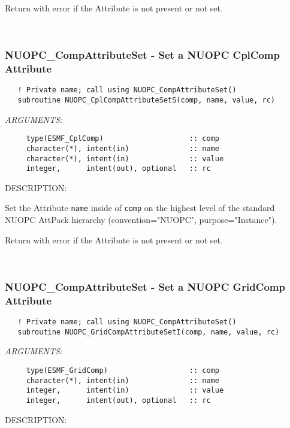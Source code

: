      Return with error if the Attribute is not present or not set. 
 
\mbox{}\hrulefill\ 
 
\subsubsection [NUOPC\_CompAttributeSet] {NUOPC\_CompAttributeSet - Set a NUOPC CplComp Attribute}


\begin{verbatim}   ! Private name; call using NUOPC_CompAttributeSet() 
   subroutine NUOPC_CplCompAttributeSetS(comp, name, value, rc)\end{verbatim}{\em ARGUMENTS:}
\begin{verbatim}     type(ESMF_CplComp)                    :: comp
     character(*), intent(in)              :: name
     character(*), intent(in)              :: value
     integer,      intent(out), optional   :: rc\end{verbatim}
{\sf DESCRIPTION:\\ }


     Set the Attribute {\tt name} inside of {\tt comp} on the highest level
     of the standard NUOPC AttPack hierarchy (convention="NUOPC", 
     purpose="Instance").
  
     Return with error if the Attribute is not present or not set. 
 
\mbox{}\hrulefill\ 
 
\subsubsection [NUOPC\_CompAttributeSet] {NUOPC\_CompAttributeSet - Set a NUOPC GridComp Attribute}


\begin{verbatim}   ! Private name; call using NUOPC_CompAttributeSet() 
   subroutine NUOPC_GridCompAttributeSetI(comp, name, value, rc)\end{verbatim}{\em ARGUMENTS:}
\begin{verbatim}     type(ESMF_GridComp)                   :: comp
     character(*), intent(in)              :: name
     integer,      intent(in)              :: value
     integer,      intent(out), optional   :: rc\end{verbatim}
{\sf DESCRIPTION:\\ }


